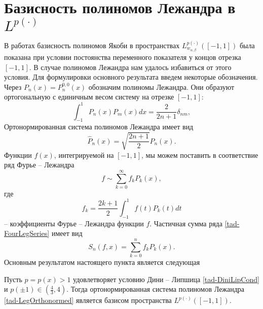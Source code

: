 \section{Базисность полиномов Лежандра в \texorpdfstring{$L^{p(\cdot)}$}{Lp(x)}}
В работах \cite{tad-SHII-Leg,tad-SHII-Jacob,tad-SHII-Ult,tad-RAM-Jacob} базисность полиномов Якоби в пространствах $L^{p(\cdot)}_{w_{\alpha,\beta}}([-1,1])$ была показана при условии постоянства переменного показателя у концов отрезка $[-1,1]$. В случае полиномов Лежандра нам удалось избавиться от этого условия. Для формулировки основного результата введем некоторые обозначения. Через $P_n(x)=P^{0,0}_n(x)$ обозначим полиномы Лежандра.
Они образуют ортогональную с единичным весом систему на отрезке $[-1,1]$:
\begin{equation*}
  \int_{-1}^1P_n(x)P_m(x)dx=\frac{2}{2n+1}\delta_{nm},
\end{equation*}
Ортонормированная система полиномов Лежандра имеет вид
\begin{equation}\label{tad-LegOrthonormed}
  \hat{P}_n(x)=\sqrt{\frac{2n+1}{2}}P_n(x).
\end{equation}
Функции $f(x)$, интегрируемой на $[-1,1]$, мы можем поставить в соответствие ряд Фурье -- Лежандра
\begin{equation}\label{tad-FourLegSeries}
  f\sim\sum_{k=0}^\infty f_kP_k(x),
\end{equation}
где
\begin{equation*}
  f_k=\frac{2k+1}{2}\int_{-1}^1f(t)P_k(t)dt
\end{equation*}
-- коэффициенты Фурье -- Лежандра функции $f$. Частичная сумма ряда \eqref{tad-FourLegSeries} имеет вид
\begin{equation*}
  S_n(f,x)=\sum_{k=0}^n f_kP_k(x).
\end{equation*}
Основным результатом настоящего пункта является следующая
\begin{theorem}
	Пусть $p=p(x)>1$ удовлетворяет условию Дини -- Липшица \eqref{tad-DiniLipCond} и $p(\pm1)\in(\frac43,4)$. Тогда ортонормированная система полиномов Лежандра \eqref{tad-LegOrthonormed} является базисом пространства $L^{p(\cdot)}([-1,1])$.
\end{theorem}

